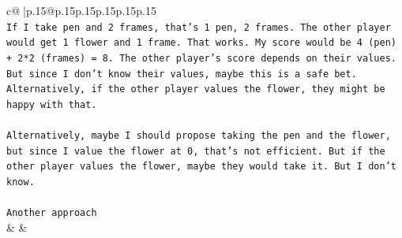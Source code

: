 \documentclass{article}
\begin{document}
{\begin{supertabular}{c@{$\;$}|p{.15\linewidth}@{}p{.15\linewidth}p{.15\linewidth}p{.15\linewidth}p{.15\linewidth}p{.15\linewidth}}
{{{\\ 
\texttt{If I take pen and 2 frames, that's 1 pen, 2 frames. The other player would get 1 flower and 1 frame. That works. My score would be 4 (pen) + 2*2 (frames) = 8. The other player's score depends on their values. But since I don't know their values, maybe this is a safe bet. Alternatively, if the other player values the flower, they might be happy with that. } \\
\\ 
\texttt{Alternatively, maybe I should propose taking the pen and the flower, but since I value the flower at 0, that's not efficient. But if the other player values the flower, maybe they would take it. But I don't know. } \\
\\ 
\texttt{Another approach} \\
            }
        }
    }
    & & \\ \\


\end{supertabular}}
\end{document}
